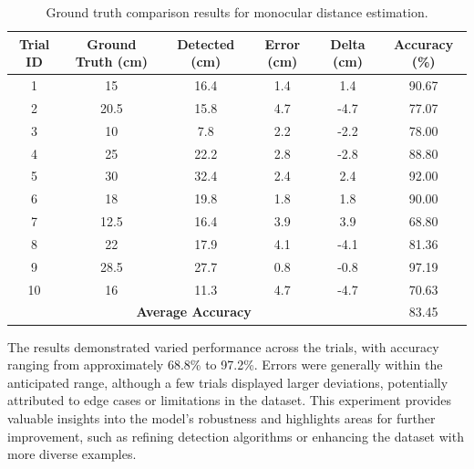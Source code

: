 \begin{table}[h!]
\centering
\begin{tabular}{|c|c|c|c|c|c|}
\hline
\textbf{Trial ID} & \textbf{Ground Truth (cm)} & \textbf{Detected (cm)} & \textbf{Error (cm)} & \textbf{Delta (cm)} & \textbf{Accuracy (\%)} \\
\hline
1 & 15 & 16.4 & 1.4 & 1.4 & 90.67 \\
2 & 20.5 & 15.8 & 4.7 & -4.7 & 77.07 \\
3 & 10 & 7.8 & 2.2 & -2.2 & 78.00 \\
4 & 25 & 22.2 & 2.8 & -2.8 & 88.80 \\
5 & 30 & 32.4 & 2.4 & 2.4 & 92.00 \\
6 & 18 & 19.8 & 1.8 & 1.8 & 90.00 \\
7 & 12.5 & 16.4 & 3.9 & 3.9 & 68.80 \\
8 & 22 & 17.9 & 4.1 & -4.1 & 81.36 \\
9 & 28.5 & 27.7 & 0.8 & -0.8 & 97.19 \\
10 & 16 & 11.3 & 4.7 & -4.7 & 70.63 \\
\hline
\multicolumn{5}{|c|}{\textbf{Average Accuracy}} & 83.45 \\
\hline
\end{tabular}
\caption{Ground truth comparison results for monocular distance estimation.}
\label{tab:distance-estimation}
\end{table}

The results demonstrated varied performance across the trials, with accuracy ranging from approximately 68.8\% to 97.2\%. Errors were generally within the anticipated range, although a few trials displayed larger deviations, potentially attributed to edge cases or limitations in the dataset. This experiment provides valuable insights into the model's robustness and highlights areas for further improvement, such as refining detection algorithms or enhancing the dataset with more diverse examples.
